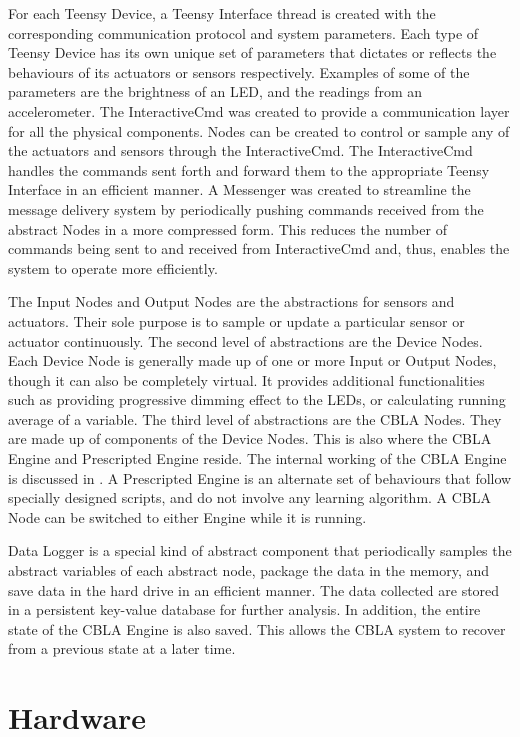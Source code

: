 For each Teensy Device, a Teensy Interface thread is created with the corresponding communication protocol and system parameters. Each type of Teensy Device has its own unique set of parameters that dictates or reflects the behaviours of its actuators or sensors respectively. Examples of some of the parameters are the brightness of an LED, and the readings from an accelerometer. The InteractiveCmd was created to provide a communication layer for all the physical components. Nodes can be created to control or sample any of the actuators and sensors through the InteractiveCmd. The InteractiveCmd handles the commands sent forth and forward them to the appropriate Teensy Interface in an efficient manner. A Messenger was created to streamline the message delivery system by periodically pushing commands received from the abstract Nodes in a more compressed form. This reduces the number of commands being sent to and received from InteractiveCmd and, thus, enables the system to operate more efficiently.

The Input Nodes and Output Nodes are the abstractions for sensors and actuators. Their sole purpose is to sample or update a particular sensor or actuator continuously. The second level of abstractions are the Device Nodes. Each Device Node is generally made up of one or more Input or Output Nodes, though it can also be completely virtual. It provides additional functionalities such as providing progressive dimming effect to the LEDs, or calculating running average of a variable. The third level of abstractions are the CBLA Nodes. They are made up of components of the Device Nodes. This is also where the CBLA Engine and Prescripted Engine reside. The internal working of the CBLA Engine is discussed in . A Prescripted Engine is an alternate set of behaviours that follow specially designed scripts, and do not involve any learning algorithm. A CBLA Node can be switched to either Engine while it is running. 

Data Logger is a special kind of abstract component that periodically samples the abstract variables of each abstract node, package the data in the memory, and save data in the hard drive in an efficient manner. The data collected are stored in a persistent key-value database for further analysis. In addition, the entire state of the CBLA Engine is also saved. This allows the CBLA system to recover from a previous state at a later time.


\section{Hardware} \label{sec:hardware}

